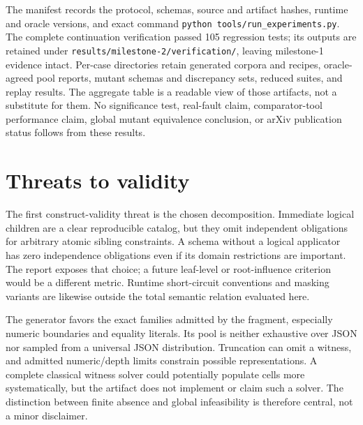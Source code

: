 \documentclass[sigconf,nonacm]{acmart}
\begin{document}
The manifest records the protocol, schemas, source and artifact hashes, runtime and oracle versions, and exact command \texttt{p\allowbreak{}y\allowbreak{}t\allowbreak{}h\allowbreak{}o\allowbreak{}n\allowbreak{} \allowbreak{}t\allowbreak{}o\allowbreak{}o\allowbreak{}l\allowbreak{}s\allowbreak{}/\allowbreak{}r\allowbreak{}u\allowbreak{}n\allowbreak{}\_\allowbreak{}e\allowbreak{}x\allowbreak{}p\allowbreak{}e\allowbreak{}r\allowbreak{}i\allowbreak{}m\allowbreak{}e\allowbreak{}n\allowbreak{}t\allowbreak{}s\allowbreak{}.\allowbreak{}p\allowbreak{}y}. The complete continuation verification passed 105 regression tests; its outputs are retained under \texttt{r\allowbreak{}e\allowbreak{}s\allowbreak{}u\allowbreak{}l\allowbreak{}t\allowbreak{}s\allowbreak{}/\allowbreak{}m\allowbreak{}i\allowbreak{}l\allowbreak{}e\allowbreak{}s\allowbreak{}t\allowbreak{}o\allowbreak{}n\allowbreak{}e\allowbreak{}-\allowbreak{}2\allowbreak{}/\allowbreak{}v\allowbreak{}e\allowbreak{}r\allowbreak{}i\allowbreak{}f\allowbreak{}i\allowbreak{}c\allowbreak{}a\allowbreak{}t\allowbreak{}i\allowbreak{}o\allowbreak{}n\allowbreak{}/}, leaving milestone-1 evidence intact. Per-case directories retain generated corpora and recipes, oracle-agreed pool reports, mutant schemas and discrepancy sets, reduced suites, and replay results. The aggregate table is a readable view of those artifacts, not a substitute for them. No significance test, real-fault claim, comparator-tool performance claim, global mutant equivalence conclusion, or arXiv publication status follows from these results.

\section{Threats to validity}
The first construct-validity threat is the chosen decomposition. Immediate logical children are a clear reproducible catalog, but they omit independent obligations for arbitrary atomic sibling constraints. A schema without a logical applicator has zero independence obligations even if its domain restrictions are important. The report exposes that choice; a future leaf-level or root-influence criterion would be a different metric. Runtime short-circuit conventions and masking variants are likewise outside the total semantic relation evaluated here.

The generator favors the exact families admitted by the fragment, especially numeric boundaries and equality literals. Its pool is neither exhaustive over JSON nor sampled from a universal JSON distribution. Truncation can omit a witness, and admitted numeric/depth limits constrain possible representations. A complete classical witness solver could potentially populate cells more systematically, but the artifact does not implement or claim such a solver. The distinction between finite absence and global infeasibility is therefore central, not a minor disclaimer. \cite{ref6}
\end{document}
